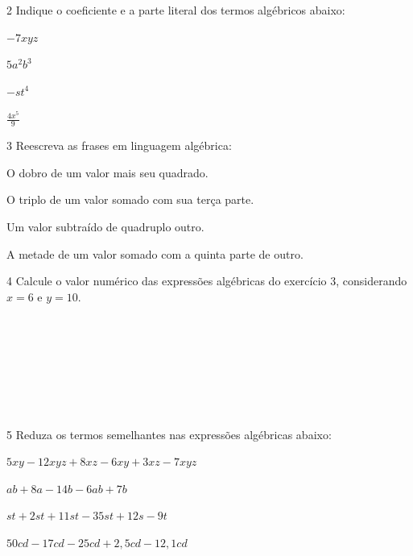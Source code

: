 \num{2} Indique o coeficiente e a parte literal dos termos algébricos abaixo:

\begin{escolha}
\item $- 7xyz$  \\
\item $5a^2b^3$  \\
\item $- st^{4}$  \\
\item $\frac{4x^{5}}{9}$ 
\end{escolha}

\num{3} Reescreva as frases em linguagem algébrica:
\begin{escolha}
\item O dobro de um valor mais seu quadrado.  \\
\item O triplo de um valor somado com sua terça parte.  \\
\item Um valor subtraído de quadruplo outro.  \\
\item A metade de um valor somado com a quinta parte de outro. 
\end{escolha}

\num{4} Calcule o valor numérico das expressões algébricas do exercício 3,
considerando $x = 6$ e $y = 10$.

 \\ \\
 \\ \\
 \\ \\
 \\

\num{5} Reduza os termos semelhantes nas expressões algébricas abaixo:

\begin{escolha}
\item $5xy - 12xyz + 8xz - 6xy + 3xz - 7xyz$ \  \\
\item $ab + 8a - 14b - 6ab + 7b$ \  \\
\item $st + 2st + 11st - 35st + 12s - 9t$ \  \\
\item $50cd - 17cd - 25cd + 2,5cd - 12,1cd$ \ 
\end{escolha}

